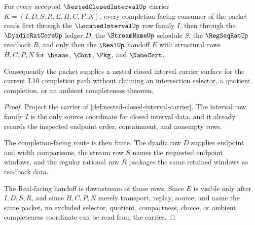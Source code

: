 \begin{theorem}
\label{thm:nested-closed-interval-seed-boundary}
For every accepted $\NestedClosedIntervalUp$ carrier $K=(I,D,S,R,E,H,C,P,N)$, every completion-facing consumer of the packet reads first through the $\LocatedIntervalUp$ row family $I$, then through the $\DyadicRatCoreUp$ ledger $D$, the $\StreamNameUp$ schedule $S$, the $\RegSeqRatUp$ readback $R$, and only then the $\RealUp$ handoff $E$ with structural rows $H,C,P,N$ for $\hsame$, $\Cont$, $\Pkg$, and $\NameCert$.

Consequently the packet supplies a nested closed interval carrier surface for the current L10 completion path without claiming an intersection selector, a quotient completion, or an ambient completeness theorem.
\end{theorem}
\begin{proof}
Project the carrier of \autoref{def:nested-closed-interval-carrier}. The interval row family $I$ is the only source coordinate for closed interval data, and it already records the inspected endpoint order, containment, and nonempty rows.

The completion-facing route is then finite. The dyadic row $D$ supplies endpoint and width comparisons, the stream row $S$ names the requested endpoint windows, and the regular rational row $R$ packages the same retained windows as readback data.

The Real-facing handoff is downstream of those rows. Since $E$ is visible only after $I,D,S,R$, and since $H,C,P,N$ merely transport, replay, source, and name the same packet, no excluded selector, quotient, compactness, choice, or ambient completeness coordinate can be read from the carrier.
\end{proof}


